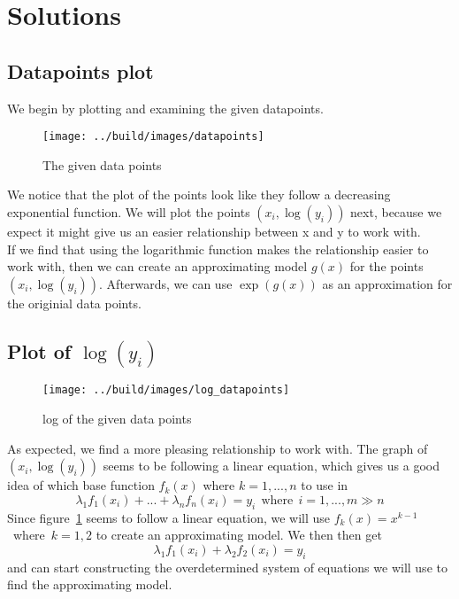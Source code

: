 \documentclass[11pt, a4paper, titlepage, openright]{article}
\begin{document}
\newpage
\section{Solutions}
\label{sec:solutions}
    \subsection{Datapoints plot}
    We begin by plotting and examining the given datapoints.
    \begin{figure}[H]
        \centering
        \texttt{[image: ../build/images/datapoints]}
        \caption{The given data points}
    \end{figure}
    
    We notice that the plot of the points look like they follow a decreasing exponential function. We will plot the points \((x_i, \log(y_i)) \) next, 
    because we expect it might give us an easier relationship between x and y to work with.\\
    
    If we find that using the logarithmic function makes the relationship easier to work with, then we can create an approximating model \(g(x)\) for the points
    \((x_i, \log(y_i)) \). Afterwards, we can use \(\exp(g(x)) \) as an approximation for the originial data points.
    
    \subsection{Plot of \(\log(y_i)\)}
    \begin{figure}[H]
        \centering
        \texttt{[image: ../build/images/log\_datapoints]}
        \caption{log of the given data points}
        \label{fig:logdata}
    \end{figure}
    As expected, we find a more pleasing relationship to work with. The graph of \((x_i, \log(y_i)) \) seems to be following a linear equation, which gives
    us a good idea of which base function \(f_k(x) \) where \(k = 1,...,n\) to use in 
    \[ \lambda_1 f_1(x_i) + ... +  \lambda_n f_n(x_i) = y_i \ \ \text{where} \ \ i = 1,...,m \gg n \]
    Since figure~\ref{fig:logdata} seems to follow a linear equation, we will use \mbox{\( f_k(x) = x^{k-1} \) where \(k = 1, 2 \)} to create an approximating 
    model. We then then get
    \[ \lambda_1 f_1(x_i) + \lambda_2 f_2(x_i) = y_i \]
    and can start constructing the overdetermined system of equations we will use to find the approximating model.
    
\end{document}
